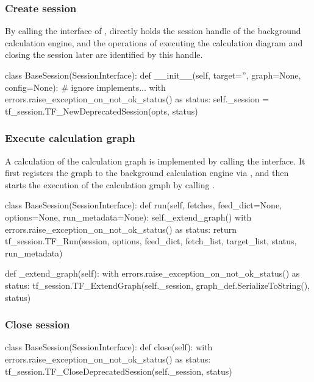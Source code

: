 \begin{content}
\subsubsection{Create session}
By calling the interface of ,  directly holds the session handle of the background calculation engine, and the operations of executing the calculation diagram and closing the session later are identified by this handle.

\begin{leftbar}
\begin{python}
class BaseSession(SessionInterface):
  def __init__(self, target='', graph=None, config=None):
    # ignore implements...
    with errors.raise_exception_on_not_ok_status() as status:
      self._session = 
        tf_session.TF_NewDeprecatedSession(opts, status)
\end{python}
\end{leftbar}


\subsubsection{Execute calculation graph}
A calculation of the calculation graph is implemented by calling the  interface. It first registers the graph to the background calculation engine via , and then starts the execution of the calculation graph by calling .

\begin{leftbar}
\begin{python}
class BaseSession(SessionInterface):
  def run(self, 
    fetches, feed_dict=None, options=None, run_metadata=None):
    self._extend_graph()
    with errors.raise_exception_on_not_ok_status() as status:
      return tf_session.TF_Run(session, 
        options, feed_dict, fetch_list, 
        target_list, status, run_metadata)
  
  def _extend_graph(self):
    with errors.raise_exception_on_not_ok_status() as status:
      tf_session.TF_ExtendGraph(self._session,
        graph_def.SerializeToString(), status)  
\end{python}
\end{leftbar}


\subsubsection{Close session}

\begin{leftbar}
\begin{python}
class BaseSession(SessionInterface):
  def close(self):
    with errors.raise_exception_on_not_ok_status() as status:
      tf_session.TF_CloseDeprecatedSession(self._session, status)
\end{python}
\end{leftbar}



\end{content}
